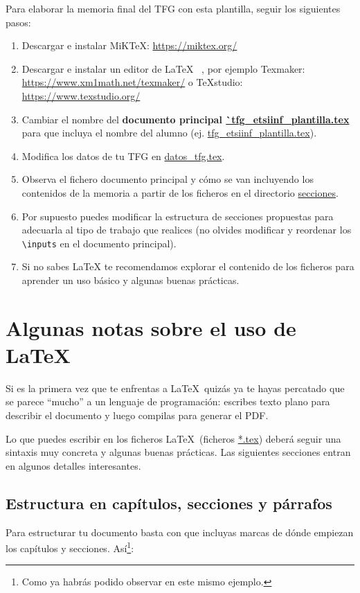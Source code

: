 Para elaborar la memoria final del TFG con esta plantilla, seguir los siguientes pasos:
\begin{enumerate}
\item Descargar e instalar MiKTeX:  \url{https://miktex.org/}
\item Descargar e instalar un editor de \LaTeX~ , por ejemplo Texmaker:
\url{https://www.xm1math.net/texmaker/} o TeXstudio: \url{https://www.texstudio.org/}
\item Cambiar el nombre del \textbf{documento principal
    \url{`tfg_etsiinf_plantilla.tex}} para que incluya el nombre del
  alumno (ej. \url{tfg_etsiinf_plantilla.tex}).
\item Modifica los datos de tu TFG en \url{datos_tfg.tex}.
\item Observa el fichero documento principal y cómo se van incluyendo
  los contenidos de la memoria a partir de los ficheros en el
  directorio \url{secciones}.
\item Por supuesto puedes modificar la estructura de secciones
  propuestas para adecuarla al tipo de trabajo que realices (no
  olvides modificar y reordenar los \verb|\inputs| en el documento
  principal).
\item Si no sabes LaTeX te recomendamos explorar el contenido de los
  ficheros para aprender un uso básico y algunas buenas prácticas.
\end{enumerate}

\section{Algunas notas sobre el uso de \LaTeX}
\label{sec:latex}

Si es la primera vez que te enfrentas a \LaTeX\ quizás ya te hayas
percatado que se parece ``mucho'' a un lenguaje de programación:
escribes texto plano para describir el documento y luego compilas para
generar el PDF.

Lo que puedes escribir en los ficheros \LaTeX\ (ficheros \url{*.tex})
deberá seguir una sintaxis muy concreta y algunas buenas
prácticas. Las siguientes secciones entran en algunos detalles
interesantes.

\subsection{Estructura en capítulos, secciones y párrafos}

Para estructurar tu documento basta con que incluyas marcas de dónde
empiezan los capítulos y secciones. Así\footnote{Como ya habrás podido
  observar en este mismo ejemplo.}:

